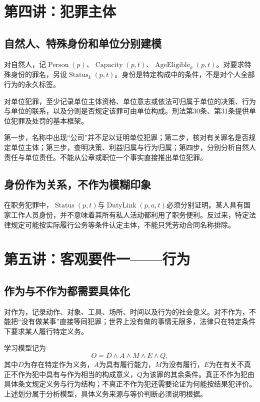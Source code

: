 \section{第四讲：犯罪主体}
\subsection{自然人、特殊身份和单位分别建模}
对自然人，记$\operatorname{Person}(p)$、$\operatorname{Capacity}(p,t)$、$\operatorname{AgeEligible}_k(p,t)$。对要求特殊身份的罪名，另设$\operatorname{Status}_k(p,t)$。身份是特定构成中的条件，不是对个人全部行为的永久标签。

对单位犯罪，至少记录单位主体资格、单位意志或依法可归属于单位的决策、行为与单位的联系，以及分则是否规定该罪可由单位构成。刑法第30条、第31条提供单位犯罪及处罚的基本框架。

第一步，名称中出现“公司”并不足以证明单位犯罪；第二步，核对有关罪名是否规定单位主体；第三步，查明决策、利益归属与行为归属；第四步，分别分析自然人责任与单位责任。不能从公章或职位一个事实直接推出单位犯罪。

\subsection{身份作为关系，不作为模糊印象}
在职务犯罪中，$\operatorname{Status}(p,t)$与$\operatorname{DutyLink}(p,a,t)$必须分别证明。某人具有国家工作人员身份，并不意味着其所有私人活动都利用了职务便利。反过来，特定法律规定可能按实际履行公务等条件认定主体，不能只凭劳动合同名称排除。


\section{第五讲：客观要件一——行为}
\subsection{作为与不作为都需要具体化}
对作为，记录动作、对象、工具、场所、时间以及行为的社会意义。对不作为，不能把“没有做某事”直接等同犯罪；世界上没有做的事情无限多，法律只在特定条件下要求某人履行特定义务。

学习模型记为
\[
 O= D\wedge A\wedge M\wedge E\wedge Q,
\]
其中$D$为存在特定作为义务，$A$为具有履行能力，$M$为没有履行，$E$为在有关不真正不作为犯中具有与作为相当的构成意义，$Q$为该罪的其余条件。真正不作为犯由具体条文规定义务与行为结构；不真正不作为犯还需要论证为何能按结果犯评价。上述划分属于分析模型，具体义务来源与等价判断必须说明根据。

